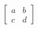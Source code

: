 \documentclass[preview]{standalone}
\begin{document}
\begin{align*}
\begin{bmatrix} a & b \\ c & d \end{bmatrix}
\end{align*}
\end{document}
